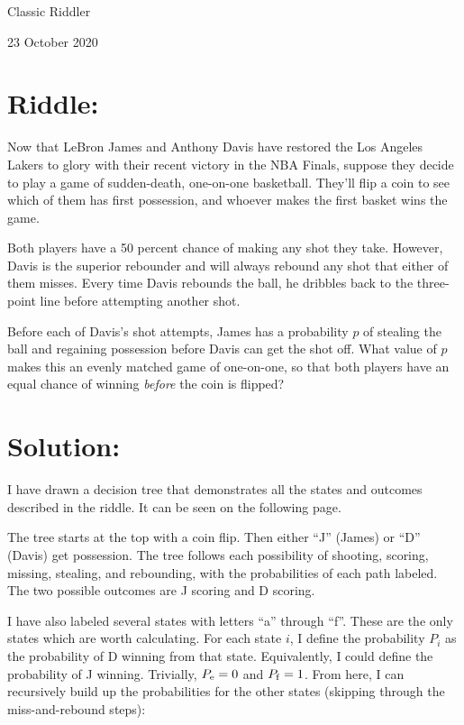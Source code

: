 \documentclass{article}
\begin{document}
\pagestyle{empty} %

\begin{center}
{\LARGE Classic Riddler}

\vspace{0.15in}

{\Large 23 October 2020}
\end{center}


\section*{Riddle:}

Now that LeBron James and Anthony Davis have restored the Los Angeles Lakers to glory with their recent victory in the NBA Finals, suppose they decide to play a game of sudden-death, one-on-one basketball.
They'll flip a coin to see which of them has first possession, and whoever makes the first basket wins the game.

Both players have a 50 percent chance of making any shot they take.
However, Davis is the superior rebounder and will always rebound any shot that either of them misses.
Every time Davis rebounds the ball, he dribbles back to the three-point line before attempting another shot.

Before each of Davis's shot attempts, James has a probability $p$ of stealing the ball and regaining possession before Davis can get the shot off.
What value of $p$ makes this an evenly matched game of one-on-one, so that both players have an equal chance of winning \textit{before} the coin is flipped?

\section*{Solution:}

I have drawn a decision tree that demonstrates all the states and outcomes described in the riddle.
It can be seen on the following page.

The tree starts at the top with a coin flip.
Then either ``J'' (James) or  ``D'' (Davis) get possession.
The tree follows each possibility of shooting, scoring, missing, stealing, and rebounding, with the probabilities of each path labeled.
The two possible outcomes are J scoring and D scoring.

I have also labeled several states with letters ``a'' through ``f''.
These are the only states which are worth calculating.
For each state $i$, I define the probability $P_{i}$ as the probability of D winning from that state.
Equivalently, I could define the probability of J winning.
Trivially, $P_{\rm{e}}=0$ and $P_{\rm{f}}=1$.
From here, I can recursively build up the probabilities for the other states (skipping through the miss-and-rebound steps):
\end{document}
